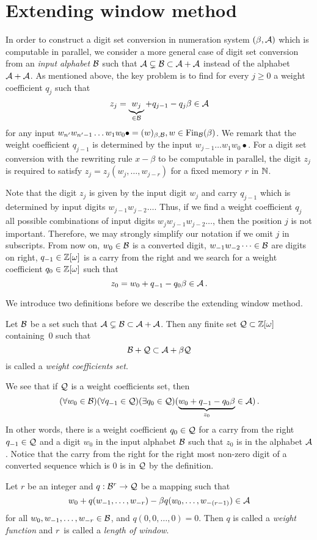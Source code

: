 \section{Extending window method}
\label{sec:methodDescription}
In order to construct a digit set conversion in numeration system $(\beta,\mathcal{A})$ which is computable in parallel, we consider a more general case of digit set conversion from an \emph{input alphabet} $\mathcal{B}$ such that $\mathcal{A} \subsetneq \mathcal{B} \subset \mathcal{A} +\mathcal{A}$ instead of the alphabet $\mathcal{A}+\mathcal{A}$.
As mentioned above, the key problem is to find for every $j\geq 0$ a weight coefficient $q_j$ such that 
    $$
        z_j=\underbrace{w_j}_{\in \mathcal{B}} + q_{j-1} - q_j \beta \in \mathcal{A} 
    $$  
    for any input $w_{n'}w_{n'-1}\dots w_1 w_0 \bullet=(w)_{\beta,\mathcal{B}}, w\in \text{Fin}_{\mathcal{B}}(\beta)$. We remark that the weight coefficient $q_{j-1}$ is determined by the input $w_{j-1}\dots w_1 w_0 \bullet$. For a digit set conversion with the rewriting rule $x-\beta$ to be computable in parallel, the digit $z_j$ is required to satisfy $z_j=z_j(w_{j},\dots,w_{j-r})$ for a fixed memory $r$ in $\mathbb{N}$.
    
    Note that the digit $z_j$ is given by the input digit $w_j$ and carry $q_{j-1}$ which is determined by input digits  $w_{j-1} w_{j-2}\dots$. Thus, if we find a weight coefficient $q_j$ all possible combinations of input digits $w_j w_{j-1} w_{j-2}\dots$, then the position $j$ is not important. Therefore, we may strongly simplify our notation if we omit $j$ in subscripts. From now on, $w_0\in\mathcal{B}$ is a converted digit, $w_{-1} w_{-2}\dots\in\mathcal{B}$ are digits on right, $q_{-1}\in\mathbb{Z}[\omega]$ is a carry from the right and we search for a weight coefficient $q_0\in\mathbb{Z}[\omega]$ such that 
    $$
    z_0=w_0 + q_{-1} - q_0 \beta \in \mathcal{A}\,.
    $$
    
   
    We introduce two definitions before we describe the extending window method.
    \begin{defn}
    \label{def:weightCoefficientsSet}
        Let $\mathcal{B}$ be a set such that $\mathcal{A} \subsetneq \mathcal{B} \subset \mathcal{A} +\mathcal{A}$. Then any finite set $\mathcal{Q}\subset\mathbb{Z}[\omega]$ containing~0 such that 
        $$
            \mathcal{B} + \mathcal{Q} \subset \mathcal{A} + \beta \mathcal{Q}
        $$  
        is called a \emph{weight coefficients set}.
    \end{defn}
    We see that if $\mathcal{Q}$ is a weight coefficients set, then
        $$
        (\forall w_0 \in \mathcal{B})(\forall q_{-1}\in\mathcal{Q})(\exists q_0 \in \mathcal{Q} )(\underbrace{w_0 + q_{-1} - q_0 \beta}_{z_0} \in \mathcal{A} )\,.
        $$
    In other words, there is a weight coefficient $q_0 \in \mathcal{Q}$ for a carry from the right $q_{-1}\in \mathcal{Q}$ and a digit $w_0$ in the input alphabet $\mathcal{B}$ such that $z_0$ is in the alphabet $\mathcal{A}$.  Notice that  the  carry from the right for the right most non-zero digit of a converted sequence which is $0$ is in $\mathcal{Q}$ by the definition.
    \begin{defn}
    Let $r$ be an integer and $q:\mathcal{B}^{r} \rightarrow \mathcal{Q}$ be a mapping such that 
    $$
    w_0+ q(w_{-1}, \dots, w_{-r}) - \beta q(w_{0}, \dots, w_{-(r-1)}) \in \mathcal{A}
    $$
    for all $w_0,w_{-1}, \dots, w_{-r} \in \mathcal{B}$, and $q(0,0,\dots,0)=0$. Then $q$ is called a \emph{weight function} and $r$~is called a \emph{length of window}.    
    \end{defn}

